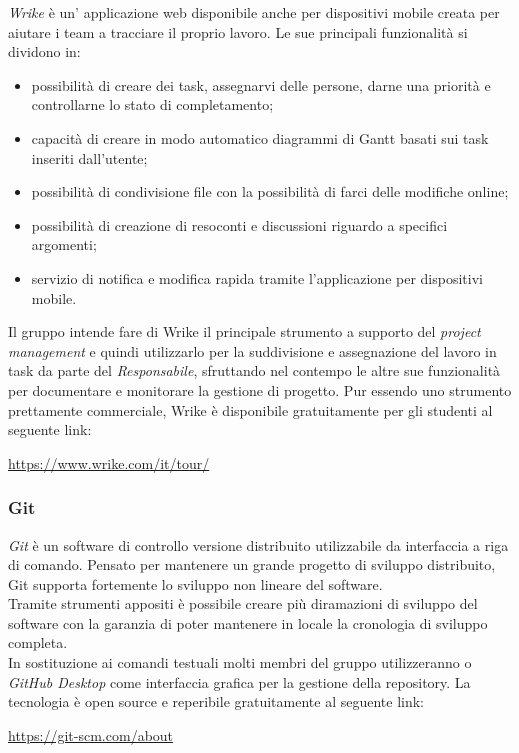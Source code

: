 \documentclass[../NormediProgetto.tex]{subfiles}
\begin{document}
	\textit{Wrike} è un' applicazione web disponibile anche per dispositivi mobile creata per aiutare i team a tracciare il proprio lavoro. Le sue principali funzionalità si dividono in:
	\begin{itemize}
		\item possibilità di creare dei task, assegnarvi delle persone, darne una priorità e controllarne lo stato di completamento;
		\item capacità di creare in modo automatico diagrammi di Gantt basati sui task inseriti dall'utente;
		\item possibilità di condivisione file con la possibilità di farci delle modifiche online;
		\item possibilità di creazione di resoconti e discussioni riguardo a specifici argomenti;
		\item servizio di notifica e modifica rapida tramite l'applicazione per dispositivi mobile.
	\end{itemize}
	
	Il gruppo intende fare di Wrike il principale strumento a supporto del \textit{project management} e quindi utilizzarlo per la suddivisione e assegnazione del lavoro in task da parte del \textit{Responsabile}, sfruttando nel contempo le altre sue funzionalità per documentare e monitorare la gestione di progetto. Pur essendo uno strumento prettamente commerciale, Wrike è disponibile gratuitamente per gli studenti al seguente link:
	\begin{center}
		\url{https://www.wrike.com/it/tour/}
	\end{center}
	
	\subsubsection{Git}
	
	\textit{Git} è un software di controllo versione distribuito utilizzabile da interfaccia a riga di comando. Pensato per mantenere un grande progetto di sviluppo distribuito, Git supporta fortemente lo sviluppo non lineare del software.
	\\ \noindent Tramite strumenti appositi è possibile creare più diramazioni di sviluppo del software con la garanzia di poter mantenere in locale la cronologia di sviluppo completa.
	\\ \noindent In sostituzione ai comandi testuali molti membri del gruppo utilizzeranno  o \textit{GitHub Desktop} come interfaccia grafica per la gestione della repository. La tecnologia è open source e reperibile gratuitamente al seguente link:
	\begin{center}
		\url{https://git-scm.com/about}
	\end{center}
	
\end{document}
